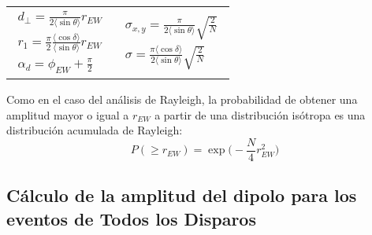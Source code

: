 \begin{tabular}{@{}p{.4\linewidth}@{}p{.5\linewidth}@{}}
    \begin{align}
        d_{\perp} = \frac{\pi}{2\langle\sin\theta \rangle} r_{EW} \label{dperp} \\
        r_1   =\frac{\pi}{2} \frac{\langle\cos\delta \rangle}{\langle\sin\theta \rangle} r_{EW} \label{r_fisico}  \\
        \alpha_d = \phi_{EW} + \frac{\pi}{2} \label{phase_fisico}
    \end{align}
    &    \begin{align}
        \sigma_{x,y} = \frac{\pi}{2\langle\sin\theta \rangle} \sqrt{\frac{2}{N}}\\
        \sigma   = \frac{\pi \langle\cos\delta \rangle}{2\langle\sin\theta \rangle} \sqrt{\frac{2}{N}}
    \end{align}
  \end{tabular}

Como en el caso del análisis de Rayleigh, la probabilidad de obtener una amplitud mayor o igual a $r_{EW}$ a partir de una distribución isótropa es una distribución acumulada de Rayleigh:
\begin{equation}
    P(\geq r_{EW}) = \exp \Big(-\frac{N}{4}r^2_{EW}\Big) \label{p99}
\end{equation}

\subsection{Cálculo  de la amplitud del dipolo para los eventos de Todos los Disparos}

